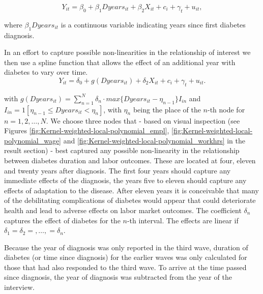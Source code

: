 \documentclass[12pt,english,british]{article}
\begin{document}
\begin{equation}
Y_{it}=\beta_{0}+\beta_{1}Dyears_{it}+\beta_{2}X_{it}+c_{i}+\gamma_{t}+u_{it},\label{eq:duration_linear}
\end{equation}


\noindent where $\beta_{1}Dyears_{it}$ is a continuous variable indicating
years since first diabetes diagnosis.

In an effort to capture possible non-linearities in the relationship of interest we then use a spline function that allows the effect
of an additional year with diabetes to vary over time.
\begin{equation}
Y_{it}=\delta_{0}+g(Dyears_{it})+\delta_{2}X_{it}+c_{i}+\gamma_{t}+u_{it}.\label{eq:splines}
\end{equation}


\noindent with $g(Dyears_{it})=\sum_{n=1}^{N}\delta_{n}\cdot max\{Dyears_{it}-\eta_{n-1}\}I_{in}$
and $I_{in}=1[\eta_{n-1}\leq Dyears_{it}<\eta_{n}]$, with $\eta_{n}$
being the place of the $n$-th node for $n=1,2,\ldots,N$. We choose
three nodes that - based on visual inspection (see Figures \ref{fig:Kernel-weighted-local-polynomial_empl}, \ref{fig:Kernel-weighted-local-polynomial_wage} and \ref{fig:Kernel-weighted-local-polynomial_workhrs} in the
result section) - best captured any possible non-linearity in the
relationship between diabetes duration and labor outcomes. These
are located at four, eleven and twenty years after diagnosis. The
first four years should capture any immediate effects of the diagnosis,
the years five to eleven should capture any effects of adaptation to
the disease. After eleven years it is conceivable that many of the
debilitating complications of diabetes would appear that could deteriorate
health and lead to adverse effects on labor market outcomes.
The coefficient $\delta_{n}$ captures the effect of diabetes for the
$n$-th interval. The effects are linear if $\delta_{1}=\delta_{2}=,\ldots,=\delta_{n}$.

Because the year of diagnosis was only reported in the third wave,
duration of diabetes (or time since diagnosis)
for the earlier waves was only calculated for those that had also responded to the third
wave. To arrive at the time passed since diagnosis, the year of diagnosis
was subtracted from the year of the interview. %
\end{document}
